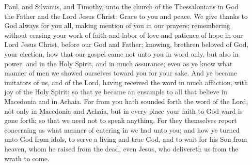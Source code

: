 


Paul, and Silvanus, and Timothy, unto the church of the Thessalonians in God the Father and the Lord Jesus Christ: Grace to you and peace.  We give thanks to God always for you all, making mention of you in our prayers; remembering without ceasing your work of faith and labor of love and patience of hope in our Lord Jesus Christ, before our God and Father; knowing, brethren beloved of God, your election, how that our gospel came not unto you in word only, but also in power, and in the Holy Spirit, and in much assurance; even as ye know what manner of men we showed ourselves toward you for your sake. And ye became imitators of us, and of the Lord, having received the word in much affliction, with joy of the Holy Spirit; so that ye became an ensample to all that believe in Macedonia and in Achaia. For from you hath sounded forth the word of the Lord, not only in Macedonia and Achaia, but in every place your faith to God-ward is gone forth; so that we need not to speak anything. For they themselves report concerning us what manner of entering in we had unto you; and how ye turned unto God from idols, to serve a living and true God, and to wait for his Son from heaven, whom he raised from the dead, even Jesus, who delivereth us from the wrath to come. 

